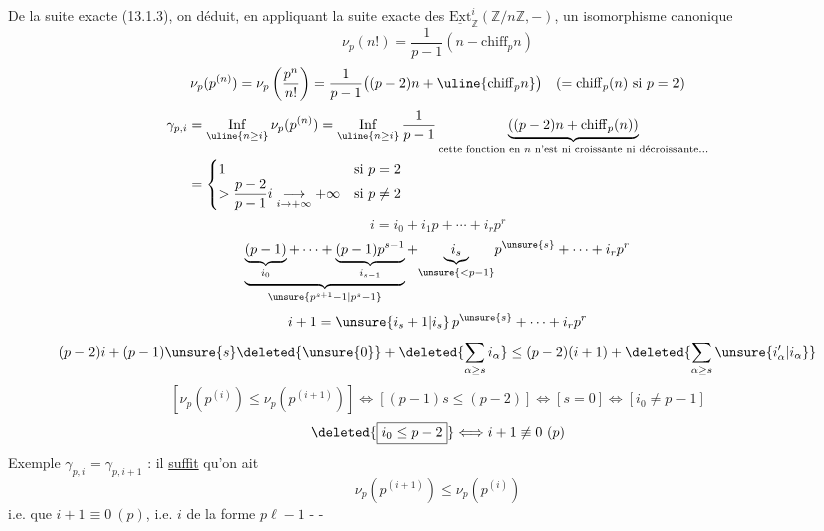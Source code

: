 De la suite exacte (13.1.3), on déduit, en appliquant la suite exacte des $\underline{\mathrm{Ext}}_{\mathbb Z}^i(\mathbb Z/n\mathbb Z,-)$, un isomorphisme canonique
\[
\nu_p(n!)=\frac1{p-1}(n-\mathrm{chiff}_p n)
\]
\[
\nu_p(p^{(n)})=\nu_p\left(\frac{p^n}{n!}\right)=\frac1{p-1}\bigl((p-2)n+\uline{\mathrm{chiff}_p n}\bigr)\quad(=\mathrm{chiff}_p(n)\text{ si }p=2)
\]
\[
\begin{aligned}
\gamma_{p,i}&=\mathop{\mathrm{Inf}}_{\uline{n\geq i}}\nu_p(p^{(n)})=\mathop{\mathrm{Inf}}_{\uline{n\geq i}}\frac1{p-1}\underbrace{((p-2)n+\mathrm{chiff}_p(n))}_{\text{cette fonction en }n\text{ n'est ni croissante ni décroissante}\ldots}\\
&=\begin{cases}1&\text{si }p=2\\>\dfrac{p-2}{p-1}i\underset{i\to+\infty}{\longrightarrow}+\infty&\text{si }p\ne2\end{cases}
\end{aligned}
\]
\[
i=i_0+i_1p+\cdots+i_rp^r
\]
\[
\underbrace{\underbrace{(p-1)}_{i_0}+\cdots+\underbrace{(p-1)p^{s-1}}_{i_{s-1}}}_{\unsure{p^{s+1}-1|p^s-1}}+\underset{\unsure{<p-1}}{\underbrace{i_s}}p^{\unsure{s}}+\cdots+i_rp^r
\]
\[
i+1=\unsure{i_s+1|i_s}\,p^{\unsure{s}}+\cdots+i_rp^r
\]
\[
(p-2)i+(p-1)\unsure{s}\deleted{\unsure{0}}+\deleted{\sum_{\alpha\geq s}i_\alpha}\leq(p-2)(i+1)+\deleted{\sum_{\alpha\geq s}\unsure{i'_\alpha|i_\alpha}}
\]
\[
[\nu_p(p^{(i)})\leq\nu_p(p^{(i+1)})]\Longleftrightarrow[(p-1)s\leq(p-2)]\Longleftrightarrow[s=0]\Longleftrightarrow[i_0\ne p-1]
\]
\[
\deleted{\boxed{i_0\leq p-2}}\Longleftrightarrow i+1\not\equiv0\ (p)
\]
Exemple  $\gamma_{p,i}=\gamma_{p,i+1}$ : il \uline{suffit} qu'on ait 
\[
\nu_p(p^{(i+1)})\leq\nu_p(p^{(i)})
\]
i.e. que   $i+1\equiv0\ (p)$,
i.e. $i$ de la forme $p\ell-1$
-  - 
